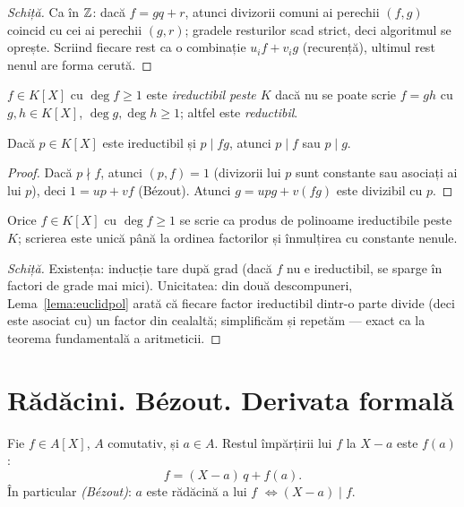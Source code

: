 \begin{proof}[Schiță]
Ca în $\mathbb{Z}$: dacă $f=gq+r$, atunci divizorii comuni ai perechii $(f,g)$ coincid cu cei ai perechii $(g,r)$; gradele resturilor scad strict, deci algoritmul se oprește. Scriind fiecare rest ca o combinație $u_if+v_ig$ (recurență), ultimul rest nenul are forma cerută.
\end{proof}

\begin{definitie}\label{def:ireductibil}
$f\in K[X]$ cu $\deg f\ge1$ este \emph{ireductibil peste $K$} dacă nu se poate scrie $f=gh$ cu $g,h\in K[X]$, $\deg g,\deg h\ge1$; altfel este \emph{reductibil}.
\end{definitie}

\begin{lema}\label{lema:euclidpol}
Dacă $p\in K[X]$ este ireductibil și $p\mid fg$, atunci $p\mid f$ sau $p\mid g$.
\end{lema}

\begin{proof}
Dacă $p\nmid f$, atunci $(p,f)=1$ (divizorii lui $p$ sunt constante sau asociați ai lui $p$), deci $1=up+vf$ (Bézout). Atunci $g=upg+v(fg)$ este divizibil cu $p$.
\end{proof}

\begin{teorema}\label{teo:descompunere}
Orice $f\in K[X]$ cu $\deg f\ge1$ se scrie ca produs de polinoame ireductibile peste $K$; scrierea este unică până la ordinea factorilor și înmulțirea cu constante nenule.
\end{teorema}

\begin{proof}[Schiță]
Existența: inducție tare după grad (dacă $f$ nu e ireductibil, se sparge în factori de grade mai mici). Unicitatea: din două descompuneri, Lema~\ref{lema:euclidpol} arată că fiecare factor ireductibil dintr-o parte divide (deci este asociat cu) un factor din cealaltă; simplificăm și repetăm --- exact ca la teorema fundamentală a aritmeticii.
\end{proof}

\section{Rădăcini. Bézout. Derivata formală}

\begin{teorema}\label{teo:rest}
Fie $f\in A[X]$, $A$ comutativ, și $a\in A$. Restul împărțirii lui $f$ la $X-a$ este $f(a)$:
\[
f=(X-a)\,q+f(a).
\]
În particular \emph{(Bézout)}: $a$ este rădăcină a lui $f$ $\iff(X-a)\mid f$.
\end{teorema}

